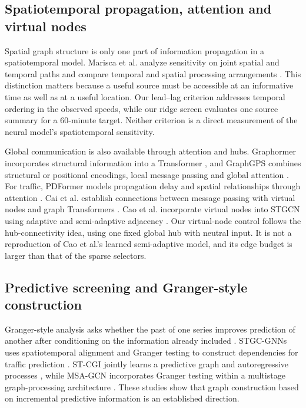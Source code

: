 \subsection{Spatiotemporal propagation, attention and virtual nodes}
Spatial graph structure is only one part of information propagation in a spatiotemporal model. Marisca et al. analyze sensitivity on joint spatial and temporal paths and compare temporal and spatial processing arrangements \cite{marisca2025stoversquashing}. This distinction matters because a useful source must be accessible at an informative time as well as at a useful location. Our lead--lag criterion addresses temporal ordering in the observed speeds, while our ridge screen evaluates one source summary for a 60-minute target. Neither criterion is a direct measurement of the neural model's spatiotemporal sensitivity.

Global communication is also available through attention and hubs. Graphormer incorporates structural information into a Transformer \cite{ying2021graphormer}, and GraphGPS combines structural or positional encodings, local message passing and global attention \cite{rampasek2022gps}. For traffic, PDFormer models propagation delay and spatial relationships through attention \cite{jiang2023pdformer}. Cai et al. establish connections between message passing with virtual nodes and graph Transformers \cite{cai2023mpnnvn}. Cao et al. incorporate virtual nodes into STGCN using adaptive and semi-adaptive adjacency \cite{cao2025virtual}. Our virtual-node control follows the hub-connectivity idea, using one fixed global hub with neutral input. It is not a reproduction of Cao et al.'s learned semi-adaptive model, and its edge budget is larger than that of the sparse selectors.

\subsection{Predictive screening and Granger-style construction}
Granger-style analysis asks whether the past of one series improves prediction of another after conditioning on the information already included \cite{granger1969}. STGC-GNNs uses spatiotemporal alignment and Granger testing to construct dependencies for traffic prediction \cite{he2022stgc}. ST-CGI jointly learns a predictive graph and autoregressive processes \cite{zhang2022stcgi}, while MSA-GCN incorporates Granger testing within a multistage graph-processing architecture \cite{feng2024msagcn}. These studies show that graph construction based on incremental predictive information is an established direction.

